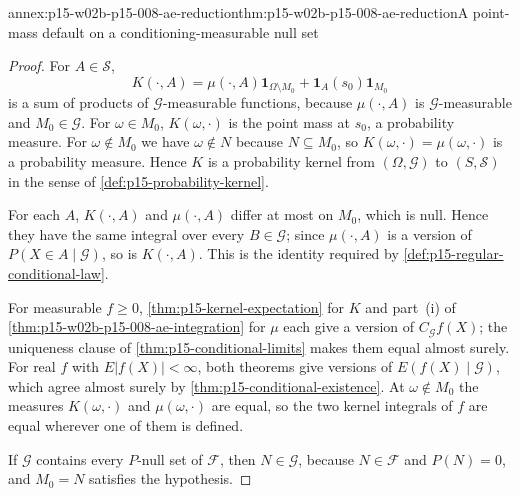 \begin{annexitem}{annex:p15-w02b-p15-008-ae-reduction}{thm:p15-w02b-p15-008-ae-reduction}{A point-mass default on a conditioning-measurable null set}
\begin{proof}
For \(A\in\mathcal S\),
\[
 K(\cdot,A)=\mu(\cdot,A)\mathbf1_{\Omega\setminus M_0}
           +\mathbf1_A(s_0)\mathbf1_{M_0}
\]
is a sum of products of \(\mathcal G\)-measurable functions, because
\(\mu(\cdot,A)\) is \(\mathcal G\)-measurable and \(M_0\in\mathcal G\).
For \(\omega\in M_0\), \(K(\omega,\cdot)\) is the point mass at \(s_0\), a
probability measure. For \(\omega\notin M_0\) we have \(\omega\notin N\)
because \(N\subseteq M_0\), so \(K(\omega,\cdot)=\mu(\omega,\cdot)\) is a
probability measure. Hence \(K\) is a probability kernel from
\((\Omega,\mathcal G)\) to \((S,\mathcal S)\) in the sense of
\cref{def:p15-probability-kernel}.

For each \(A\), \(K(\cdot,A)\) and \(\mu(\cdot,A)\) differ at most on
\(M_0\), which is null. Hence they have the same integral over every
\(B\in\mathcal G\); since \(\mu(\cdot,A)\) is a version of
\(P(X\in A\mid\mathcal G)\), so is \(K(\cdot,A)\). This is the identity
required by \cref{def:p15-regular-conditional-law}.

For measurable \(f\geq0\), \cref{thm:p15-kernel-expectation} for \(K\)
and part~(i) of \cref{thm:p15-w02b-p15-008-ae-integration} for \(\mu\)
each give a version of \(C_{\mathcal G}f(X)\); the uniqueness clause of
\cref{thm:p15-conditional-limits} makes them equal almost surely. For real
\(f\) with \(E|f(X)|<\infty\), both theorems give versions of
\(E(f(X)\mid\mathcal G)\), which agree almost surely by
\cref{thm:p15-conditional-existence}. At \(\omega\notin M_0\) the measures
\(K(\omega,\cdot)\) and \(\mu(\omega,\cdot)\) are equal, so the two kernel
integrals of \(f\) are equal wherever one of them is defined.

If \(\mathcal G\) contains every \(P\)-null set of \(\mathcal F\), then
\(N\in\mathcal G\), because \(N\in\mathcal F\) and \(P(N)=0\), and
\(M_0=N\) satisfies the hypothesis.
\end{proof}
\end{annexitem}


